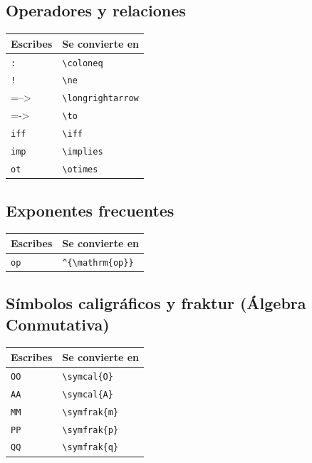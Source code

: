 \documentclass[11pt]{article}
\begin{document}
\subsection{Operadores y relaciones}
\label{sec:org9e84682}
\begin{center}
\begin{tabular}{ll}
Escribes & Se convierte en\\
\hline
\texttt{:} & \texttt{\textbackslash{}coloneq}\\
\texttt{!} & \texttt{\textbackslash{}ne}\\
=--> & \texttt{\textbackslash{}longrightarrow}\\
=-> & \texttt{\textbackslash{}to}\\
\texttt{iff} & \texttt{\textbackslash{}iff}\\
\texttt{imp} & \texttt{\textbackslash{}implies}\\
\texttt{ot} & \texttt{\textbackslash{}otimes}\\
\end{tabular}
\end{center}
\subsection{Exponentes frecuentes}
\label{sec:orgc5ac3c9}
\begin{center}
\begin{tabular}{ll}
Escribes & Se convierte en\\
\hline
\texttt{op} & \texttt{\textasciicircum{}\{\textbackslash{}mathrm\{op\}\}}\\
\end{tabular}
\end{center}
\subsection{Símbolos caligráficos y fraktur (Álgebra Conmutativa)}
\label{sec:orgd65f66c}
\begin{center}
\begin{tabular}{ll}
Escribes & Se convierte en\\
\hline
\texttt{OO} & \texttt{\textbackslash{}symcal\{O\}}\\
\texttt{AA} & \texttt{\textbackslash{}symcal\{A\}}\\
\texttt{MM} & \texttt{\textbackslash{}symfrak\{m\}}\\
\texttt{PP} & \texttt{\textbackslash{}symfrak\{p\}}\\
\texttt{QQ} & \texttt{\textbackslash{}symfrak\{q\}}\\
\end{tabular}
\end{center}
\end{document}
